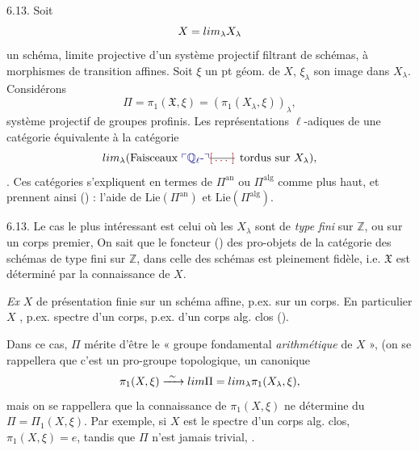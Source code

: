 \documentclass[11pt,a4paper]{article}
\begin{document}
6.13. Soit
\[
  X = \varprojlim_\lambda X_\lambda
\]
un schéma, limite  projective d'un système projectif filtrant de
schémas, à morphismes de transition affines. Soit $\xi$ un pt géom. de $X$,
$\xi_\lambda$ son image dans $X_\lambda$. Considérons
\[
  \Pi = \pi_1(\mathfrak{X}, \xi) = (\pi_1(X_\lambda, \xi))_\lambda ,
\]
système projectif de groupes profinis. Les représentations $\ell$-adiques de
    \struck{\ill{}}
une catégorie équivalente à la catégorie
\[
  \varinjlim_\lambda (\text{Faisceaux \add{$\mathbb{Q}_\ell$-}\struck{\ill{}} tordus sur } X_\lambda),
\]
\uncertain{\ill{}}  . Ces catégories s'expliquent en
termes de $\Pi^{\mathrm{an}}$ ou $\Pi^{\mathrm{alg}}$ comme  
 plus haut, et prennent ainsi ()  :
l'aide de $\mathrm{Lie}(\Pi^{\mathrm{an}})$ et $\mathrm{Lie}(\Pi^{\mathrm{alg}})$.

6.13. Le cas le plus intéressant est celui où les $X_\lambda$ sont de
\emph{type fini} sur  $\mathbb{Z}$, ou sur un corps premier,
 On sait que le foncteur 
() des pro-objets de la catégorie des schémas de type fini sur
$\mathbb{Z}$, dans celle des schémas est pleinement fidèle, i.e. $\mathfrak{X}$ est
déterminé par la connaissance de $X$.

\emph{Ex} $X$ de présentation finie sur un schéma affine, p.ex. sur un corps.
En particulier $X$ , p.ex. spectre d'un corps, p.ex. d'un corps
alg. clos ().

Dans ce cas, $\Pi$ mérite d'être   le « groupe fondamental
\emph{arithmétique} de $X$ », (on se rappellera que c'est un 
pro-groupe topologique,  un  canonique
\[
  \pi_1(X,\xi) \xrightarrow{\ \sim\ } \varprojlim \Pi = \varprojlim_\lambda \pi_1(X_\lambda, \xi) ,
\]
mais on se rappellera que la connaissance de $\pi_1(X,\xi)$ ne détermine
  du 
\struck{\ill{}} $\Pi = \Pi_1(X,\xi)$. Par exemple, si $X$ est le spectre d'un
corps alg. clos, $\pi_1(X,\xi) = e$, tandis que $\Pi$ n'est 
jamais trivial, \uncertain{\ill{}}   .
\end{document}
